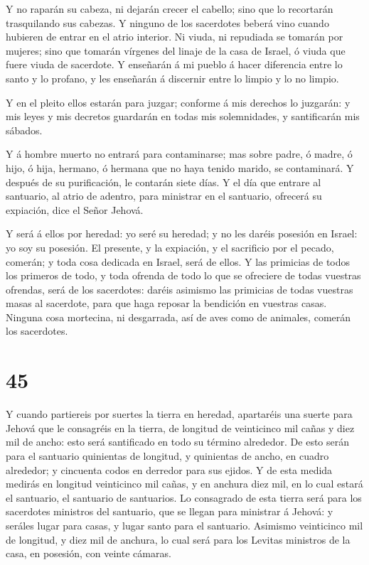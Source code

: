  Y no raparán su cabeza, ni dejarán crecer el cabello; sino
que lo recortarán trasquilando sus cabezas.  Y ninguno de
los sacerdotes beberá vino cuando hubieren de entrar en el atrio
interior.  Ni viuda, ni repudiada se tomarán por mujeres;
sino que tomarán vírgenes del linaje de la casa de Israel, ó viuda que
fuere viuda de sacerdote.  Y enseñarán á mi pueblo á hacer
diferencia entre lo santo y lo profano, y les enseñarán á discernir
entre lo limpio y lo no limpio.

 Y en el pleito ellos estarán para juzgar; conforme á mis
derechos lo juzgarán: y mis leyes y mis decretos guardarán en todas mis
solemnidades, y santificarán mis sábados.

 Y á hombre muerto no entrará para contaminarse; mas sobre
padre, ó madre, ó hijo, ó hija, hermano, ó hermana que no haya tenido
marido, se contaminará.  Y después de su purificación, le
contarán siete días.  Y el día que entrare al santuario, al
atrio de adentro, para ministrar en el santuario, ofrecerá su expiación,
dice el Señor Jehová.

 Y será á ellos por heredad: yo seré su heredad; y no les
daréis posesión en Israel: yo soy su posesión.  El
presente, y la expiación, y el sacrificio por el pecado, comerán; y toda
cosa dedicada en Israel, será de ellos.  Y las primicias de
todos los primeros de todo, y toda ofrenda de todo lo que se ofreciere
de todas vuestras ofrendas, será de los sacerdotes: daréis asimismo las
primicias de todas vuestras masas al sacerdote, para que haga reposar la
bendición en vuestras casas.  Ninguna cosa mortecina, ni
desgarrada, así de aves como de animales, comerán los sacerdotes.

\hypertarget{section-44}{%
\section{45}\label{section-44}}

 Y cuando partiereis por suertes la tierra en heredad,
apartaréis una suerte para Jehová que le consagréis en la tierra, de
longitud de veinticinco mil cañas y diez mil de ancho: esto será
santificado en todo su término alrededor.  De esto serán
para el santuario quinientas de longitud, y quinientas de ancho, en
cuadro alrededor; y cincuenta codos en derredor para sus ejidos.
 Y de esta medida medirás en longitud veinticinco mil cañas,
y en anchura diez mil, en lo cual estará el santuario, el santuario de
santuarios.  Lo consagrado de esta tierra será para los
sacerdotes ministros del santuario, que se llegan para ministrar á
Jehová: y seráles lugar para casas, y lugar santo para el santuario.
 Asimismo veinticinco mil de longitud, y diez mil de
anchura, lo cual será para los Levitas ministros de la casa, en
posesión, con veinte cámaras.

